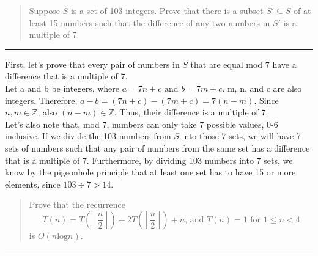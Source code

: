 \documentclass[11pt]{article}
\begin{document}



\begin{quote}
    Suppose $S$ is a set of 103 integers. Prove that there is a subset $S' \subseteq S$ of at least 15 numbers such that the difference of any two numbers in $S'$ is a multiple of 7.
\end{quote}
\hrule



\begin{solution}
    First, let's prove that every pair of numbers in $S$ that are equal mod 7 have a difference that is a multiple of 7. \\
    Let a and b be integers, where $a = 7n + c\text{ and }b = 7m + c$. m, n, and c are also integers. Therefore, $a - b = (7n + c) - (7m + c) = 7(n - m)$. Since $n, m \in \mathbb{Z}$, also $(n - m) \in \mathbb{Z}$. Thus, their difference is a multiple of 7. \\
    Let's also note that, mod 7, numbers can only take 7 possible values, 0-6 inclusive. If we divide the 103 numbers from $S$ into those 7 sets, we will have 7 sets of numbers such that any pair of numbers from the same set has a difference that is a multiple of 7. Furthermore, by dividing 103 numbers into 7 sets, we know by the pigeonhole principle that at least one set has to have 15 or more elements, since $103 \div 7 > 14$.
\end{solution}



\begin{quote}
    Prove that the recurrence 
    \[
        T(n) = T\left(\left \lfloor{\frac{n}{2}} \right \rfloor\right) + 2T\left(\left \lfloor{\frac{n}{2}} \right \rfloor \right) + n\text{, and } T(n) = 1 \text{ for } 1\leq n < 4
    \]
    is $O(n\text{log}n)$.
\end{quote}
\hrule
\end{document}
